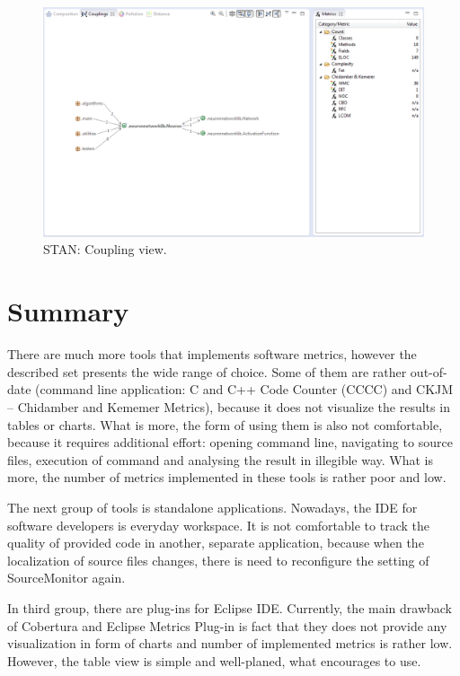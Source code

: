 \begin{figure}[h!]
	\centering
	\includegraphics[scale=0.55]{img/stan2.png} 
	\caption{STAN: Coupling view.}		
	\label{fig:stan2}
\end{figure}

\newpage

\section{Summary}

There are much more tools that implements software metrics, however the described set presents the wide range of choice. Some of them are rather out-of-date (command line application: C and C++ Code Counter (CCCC) and CKJM -- Chidamber and Kememer Metrics), because it does not visualize the results in tables or charts. What is more, the form of using them is also not comfortable, because it requires additional effort: opening command line, navigating to source files, execution of command and analysing the result in illegible way. What is more, the number of metrics implemented in these tools is rather poor and low.  

The next group of tools is standalone applications. Nowadays, the \ac{IDE} for software developers is everyday workspace. It is not comfortable to track the quality of provided code in another, separate application, because when the localization of source files changes, there is need to reconfigure the setting of SourceMonitor again. 

In third group, there are plug-ins for Eclipse \ac{IDE}. Currently, the main drawback of Cobertura and Eclipse Metrics Plug-in is fact that they does not provide any visualization in form of charts and number of implemented metrics is rather low. However, the table view is simple and well-planed, what encourages to use.

